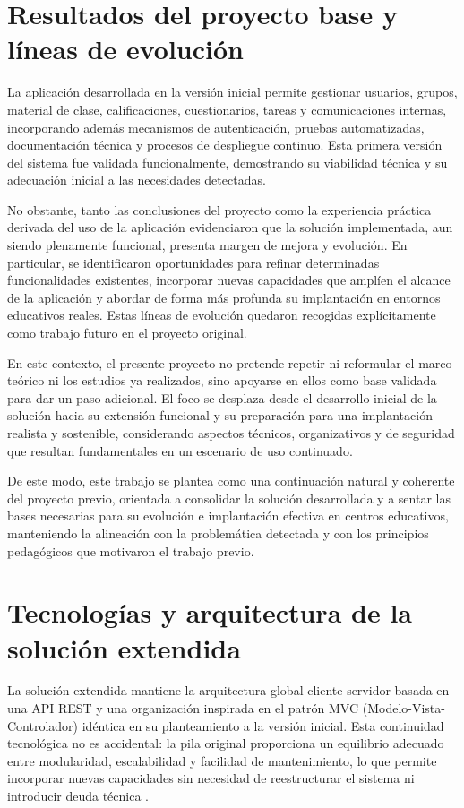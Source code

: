 \section{Resultados del proyecto base y líneas de evolución}
La aplicación desarrollada en la versión inicial permite gestionar usuarios, grupos, material de clase, calificaciones, cuestionarios, tareas y comunicaciones internas, incorporando además mecanismos de autenticación, pruebas automatizadas, documentación técnica y procesos de despliegue continuo. Esta primera versión del sistema fue validada funcionalmente, demostrando su viabilidad técnica y su adecuación inicial a las necesidades detectadas.

No obstante, tanto las conclusiones del proyecto como la experiencia práctica derivada del uso de la aplicación evidenciaron que la solución implementada, aun siendo plenamente funcional, presenta margen de mejora y evolución. En particular, se identificaron oportunidades para refinar determinadas funcionalidades existentes, incorporar nuevas capacidades que amplíen el alcance de la aplicación y abordar de forma más profunda su implantación en entornos educativos reales. Estas líneas de evolución quedaron recogidas explícitamente como trabajo futuro en el proyecto original.

En este contexto, el presente proyecto no pretende repetir ni reformular el marco teórico ni los estudios ya realizados, sino apoyarse en ellos como base validada para dar un paso adicional. El foco se desplaza desde el desarrollo inicial de la solución hacia su extensión funcional y su preparación para una implantación realista y sostenible, considerando aspectos técnicos, organizativos y de seguridad que resultan fundamentales en un escenario de uso continuado.

De este modo, este trabajo se plantea como una continuación natural y coherente del proyecto previo, orientada a consolidar la solución desarrollada y a sentar las bases necesarias para su evolución e implantación efectiva en centros educativos, manteniendo la alineación con la problemática detectada y con los principios pedagógicos que motivaron el trabajo previo.
\section{Tecnologías y arquitectura de la solución extendida}
\label{sec:tecnologias_ext}

La solución extendida mantiene la arquitectura global cliente-servidor \cite{Tanenbaum2007} basada en una API REST y una organización inspirada en el patrón MVC (Modelo-Vista-Controlador) idéntica en su planteamiento a la versión inicial. Esta continuidad tecnológica no es accidental: la pila original proporciona un equilibrio adecuado entre modularidad, escalabilidad y facilidad de mantenimiento, lo que permite incorporar nuevas capacidades sin necesidad de reestructurar el sistema ni introducir deuda técnica \cite{Pressman2010}.

